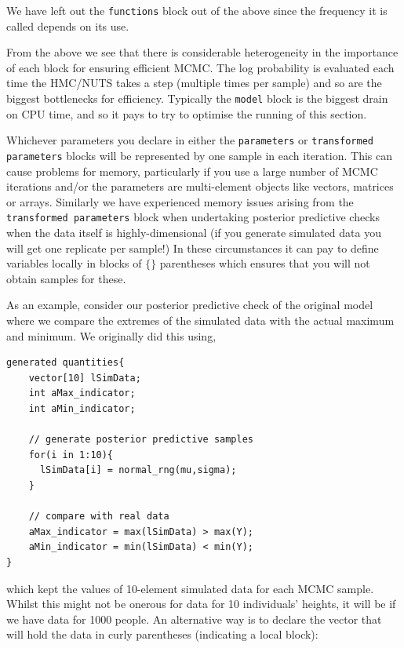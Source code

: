 \documentclass[11pt,fullpage]{book}
\begin{document}
We have left out the \texttt{functions} block out of the above since the frequency it is called depends on its use. 

From the above we see that there is considerable heterogeneity in the importance of each block for ensuring efficient MCMC. The log probability is evaluated each time the HMC/NUTS takes a step (multiple times per sample) and so are the biggest bottlenecks for efficiency. Typically the \texttt{model} block is the biggest drain on CPU time, and so it pays to try to optimise the running of this section.

Whichever parameters you declare in either the \texttt{parameters} or \texttt{transformed parameters} blocks will be represented by one sample in each iteration. This can cause problems for memory, particularly if you use a large number of MCMC iterations and/or the parameters are multi-element objects like vectors, matrices or arrays. Similarly we have experienced memory issues arising from the \texttt{transformed parameters} block when undertaking posterior predictive checks when the data itself is highly-dimensional (if you generate simulated data you will get one replicate per sample!) In these circumstances it can pay to define variables locally in blocks of $\{\}$ parentheses which ensures that you will not obtain samples for these. 

As an example, consider our posterior predictive check of the original model where we compare the extremes of the simulated data with the actual maximum and minimum. We originally did this using,

\begin{verbatim}
generated quantities{
    vector[10] lSimData;
    int aMax_indicator;
    int aMin_indicator;
      
    // generate posterior predictive samples
    for(i in 1:10){
      lSimData[i] = normal_rng(mu,sigma);
    }
     
    // compare with real data 
    aMax_indicator = max(lSimData) > max(Y);
    aMin_indicator = min(lSimData) < min(Y);
}
\end{verbatim}

which kept the values of 10-element simulated data for each MCMC sample. Whilst this might not be onerous for data for 10 individuals' heights, it will be if we have data for 1000 people. An alternative way is to declare the vector that will hold the data in curly parentheses (indicating a local block):
\end{document}
